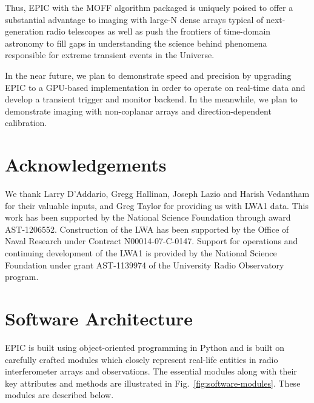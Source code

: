 \documentclass[a4paper,fleqn,usenatbib]{mnras}
\begin{document}
Thus, EPIC with the MOFF algorithm packaged is uniquely poised to offer a substantial advantage to imaging with large-N dense arrays typical of next-generation radio telescopes as well as push the frontiers of time-domain astronomy to fill gaps in understanding the science behind phenomena responsible for extreme transient events in the Universe.

In the near future, we plan to demonstrate speed and precision by upgrading EPIC to a GPU-based implementation in order to operate on real-time data and develop a transient trigger and monitor backend. In the meanwhile, we plan to demonstrate imaging with non-coplanar arrays and direction-dependent calibration.

\section*{Acknowledgements}

We thank Larry D'Addario, Gregg Hallinan, Joseph Lazio and Harish Vedantham for their valuable inputs, and Greg Taylor for providing us with LWA1 data. This work has been supported by the National Science Foundation through award AST-1206552. Construction of the LWA has been supported by the Office of Naval Research under Contract N00014-07-C-0147. Support for operations and continuing development of the LWA1 is provided by the National Science Foundation under grant AST-1139974 of the University Radio Observatory program.



 
%  
% 


\appendix

\section{Software Architecture}\label{sec:software-modules}

EPIC is built using object-oriented programming in Python and is built on carefully crafted modules which closely represent real-life entities in radio interferometer arrays and observations. The essential modules along with their key attributes and methods are illustrated in Fig.~\ref{fig:software-modules}. These modules are described below.
\end{document}
